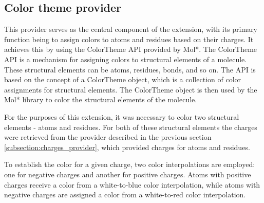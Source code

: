 \documentclass[
  digital,     %
  oneside,     %
  nosansbold,  %
  nocolorbold, %
  lof,         %
  lot,         %
]{fithesis4}
\begin{document}

\subsection{Color theme provider}
\label{subsection:color_theme_provider}


This provider serves as the central component of the extension, with its primary function being to assign colors to atoms and residues based on their charges. It achieves this by using the ColorTheme API provided by Mol*. The ColorTheme API is a mechanism for assigning colors to structural elements of a molecule. These structural elements can be atoms, residues, bonds, and so on. The API is based on the concept of a ColorTheme object, which is a collection of color assignments for structural elements. The ColorTheme object is then used by the Mol* library to color the structural elements of the molecule.

For the purposes of this extension, it was necessary to color two structural elements - atoms and residues. For both of these structural elements the charges were retrieved from the provider described in the previous section \ref{subsection:charges_provider}, which provided charges for atoms and residues.

To establish the color for a given charge, two color interpolations are employed: one for negative charges and another for positive charges. Atoms with positive charges receive a color from a white-to-blue color interpolation, while atoms with negative charges are assigned a color from a white-to-red color interpolation.
\end{document}
